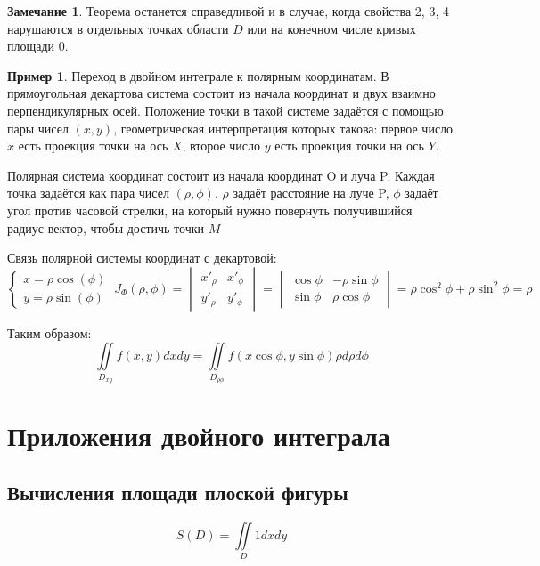 \documentclass[a4paper, 14pt]{report}
\theoremstyle{definition}
\newtheorem*{note}{Замечание}
\newtheorem*{example}{Пример}
\begin{document}
 		\begin{note}
		 	Теорема останется справедливой и в случае, когда свойства 2, 3, 4 нарушаются в отдельных точках области $D$ или на конечном числе кривых площади 0.
	 	\end{note}
		
		\begin{example}
			Переход в двойном интеграле к полярным координатам. В прямоугольная декартова система состоит из начала координат и двух взаимно перпендикулярных осей. Положение точки в такой системе задаётся с помощью пары чисел $(x, y)$, геометрическая интерпретация которых такова: первое число $x$ есть проекция точки на ось $X$, второе число $y$ есть проекция точки на ось $Y$.
			
			Полярная система координат состоит из начала координат O и луча P. Каждая точка задаётся как пара чисел $(\rho, \phi)$. $\rho$ задаёт расстояние на луче P, $\phi$ задаёт угол против часовой стрелки, на который нужно повернуть получившийся радиус-вектор, чтобы достичь точки $M$
			
	 		Связь полярной системы координат с декартовой:
	 		\begin{equation}
	 			\begin{cases}
	 				x=\rho \cos(\phi)\\
	 				y=\rho \sin(\phi)
	 			\end{cases}
 				~
 				J_\Phi(\rho, \phi)=
 				\begin{vmatrix}
 					x'_\rho & x'_\phi \\
 					y'_\rho & y'_\phi
 				\end{vmatrix}=
	 			\begin{vmatrix}
	 				\cos\phi & -\rho\sin\phi \\
	 				\sin\phi & \rho\cos\phi
	 			\end{vmatrix}=
 				\rho\cos^2\phi+\rho\sin^2\phi=\rho
	 		\end{equation}
 			
 			Таким образом:
 			\begin{equation}
 				\iint\limits_{D_{xy}}f(x,y)dxdy=
 				\iint\limits_{D_{\rho\phi}}f(x\cos\phi, y\sin\phi)\rho d\rho d\phi
 			\end{equation}
	 	\end{example}
 	
 	\section{Приложения двойного интеграла}
 		\subsection{Вычисления площади плоской фигуры}
 			\begin{equation}
 				S(D)=\iint\limits_{D}1dxdy
 			\end{equation}
 		
\end{document}
